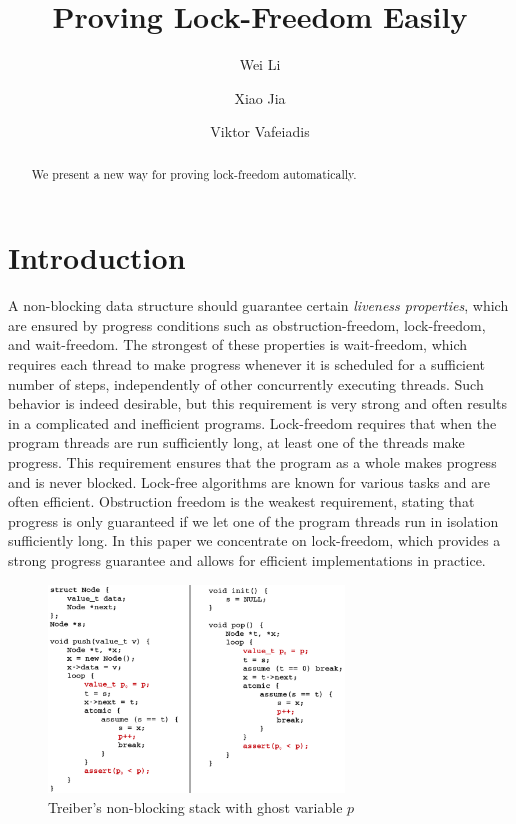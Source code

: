 \documentclass{article}
\title{Proving Lock-Freedom Easily}
\author{
Wei Li \and Xiao Jia \and Viktor Vafeiadis
}
\begin{document}
\maketitle

\begin{abstract}
We present a new way for proving lock-freedom automatically.
\end{abstract}

\section{Introduction}
\label{sec:intro}
A non-blocking data structure should guarantee certain \textit{liveness properties}, which are ensured by progress conditions such as obstruction-freedom, lock-freedom, and wait-freedom. The strongest of these properties is wait-freedom, which requires each thread to make progress whenever it is scheduled for a sufficient number of steps, independently of other concurrently executing threads. Such behavior is indeed desirable, but this requirement is very strong and often results in a complicated and inefficient programs. Lock-freedom requires that when the program threads are run sufficiently long, at least one of the threads make progress. This requirement ensures that the program as a whole makes progress and is never blocked. Lock-free algorithms are known for various tasks and are often efficient. Obstruction freedom is the weakest requirement, stating that progress is only guaranteed if we let one of the program threads run in isolation sufficiently long. In this paper we concentrate on lock-freedom, which provides a strong progress guarantee and allows for efficient implementations in practice.

\begin{figure}
    \centering
    \includegraphics[width=0.7\textwidth]{treiber.png}
    \caption{Treiber's non-blocking stack with ghost variable $p$}
    \label{fig:treiber}
\end{figure}
\end{document}
